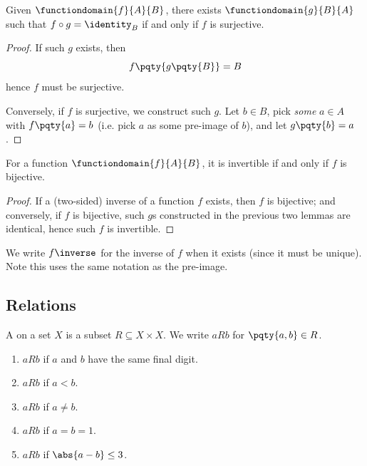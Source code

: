 \begin{lemma}
    Given \(\functiondomain{f}{A}{B}\), there exists \(\functiondomain{g}{B}{A}\) such that \(f \circ g = \identity_B\) if and only if \(f\) is surjective.
\end{lemma}

\begin{proof}
    If such \(g\) exists, then
    \[
        f \pqty{g \pqty{B}} = B
    \]
    hence \(f\) must be surjective.

    Conversely, if \(f\) is surjective, we construct such \(g\). Let \(b \in B\), pick \emph{some} \(a \in A\) with \(f\pqty{a} = b\) (i.e. pick \(a\) as some pre-image of \(b\)), and let \(g \pqty{b} = a\).
\end{proof}

\begin{theorem}
    For a function \(\functiondomain{f}{A}{B}\), it is invertible if and only if \(f\) is bijective.
\end{theorem}

\begin{proof}
    If a (two-sided) inverse of a function \(f\) exists, then \(f\) is bijective; and conversely, if \(f\) is bijective, such \(g\)s constructed in the previous two lemmas are identical, hence such \(f\) is invertible.
\end{proof}

\begin{notation}
    We write \(f\inverse\) for the inverse of \(f\) when it exists (since it must be unique). Note this uses the same notation as the pre-image.
\end{notation}

\subsection{Relations}
\label{sec:relations}

\begin{definition}[Relation]
    A  on a set \(X\) is a subset \(R \subseteq X \times X\). We write \(aRb\) for \(\pqty{a, b} \in R\).
\end{definition}

\begin{examples}
    \begin{enumerate}
        \item \(aRb\) if \(a\) and \(b\) have the same final digit.
        \item \(aRb\) if \(a < b\).
        \item \(aRb\) if \(a \neq b\).
        \item \(aRb\) if \(a = b = 1\).
        \item \(aRb\) if \(\abs{a - b} \leq 3\).
    \end{enumerate}
\end{examples}

